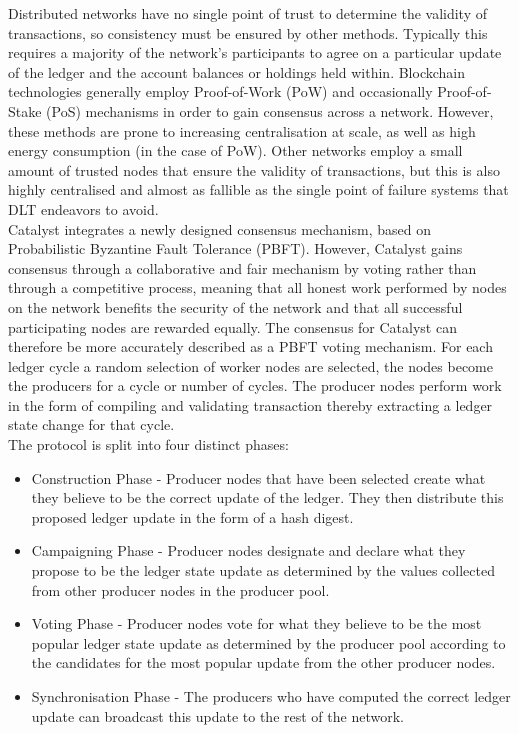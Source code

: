 Distributed networks have no single point of trust to determine the validity of transactions, so consistency must be ensured by other methods. Typically this requires a majority of the network's participants to agree on a particular update of the ledger and the account balances or holdings held within. %
Blockchain technologies generally employ Proof-of-Work (PoW) and occasionally Proof-of-Stake (PoS) mechanisms in order to gain consensus across a network. However, these methods are prone to increasing centralisation at scale, as well as high energy consumption (in the case of PoW). Other networks employ a small amount of trusted nodes that ensure the validity of transactions, but this is also highly centralised and almost as fallible as the single point of failure systems that DLT endeavors to avoid. \\

Catalyst integrates a newly designed consensus mechanism, based on Probabilistic Byzantine Fault Tolerance (PBFT). However, Catalyst gains consensus through a collaborative and fair mechanism by voting rather than through a competitive process, meaning that all honest work performed by nodes on the network benefits the security of the network and that all successful participating nodes are rewarded equally. The consensus for Catalyst can therefore be more accurately described as a PBFT voting mechanism. For each ledger cycle a random selection of worker nodes are selected, the nodes become the producers for a cycle or number of cycles. The producer nodes perform work in the form of compiling and validating transaction thereby extracting a ledger state change for that cycle. \\

The protocol is split into four distinct phases:

\begin{itemize}

\item Construction Phase - Producer nodes that have been selected create what they believe to be the correct update of the ledger. They then distribute this proposed ledger update in the form of a hash digest.
\item Campaigning Phase - Producer nodes designate and declare what they propose to be the ledger state update as determined by the values collected from other producer nodes in the producer pool.
\item Voting Phase - Producer nodes vote for what they believe to be the most popular ledger state update as determined by the producer pool according to the candidates for the most popular update from the other producer nodes.
\item Synchronisation Phase - The producers who have computed the correct ledger update can broadcast this update to the rest of the network.

\end{itemize}

